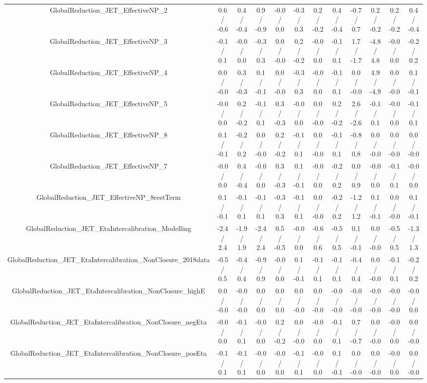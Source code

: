 \begin{table}[htbp]
\begin{center}
\begin{tabular}{|c|c|c|c|c|c|c|c|c|c|c|c|}
  GlobalReduction_JET_EffectiveNP_2 & 0.6 / -0.6 & 0.4 / -0.4 & 0.9 / -0.9 & -0.0 / 0.0 & -0.3 / 0.3 & 0.2 / -0.2 & 0.4 / -0.4 & -0.7 / 0.7 & 0.2 / -0.2 & 0.2 / -0.2 & 0.4 / -0.4 \\ 
  GlobalReduction_JET_EffectiveNP_3 & -0.1 / 0.1 & -0.0 / 0.0 & -0.3 / 0.3 & 0.0 / -0.0 & 0.2 / -0.2 & -0.0 / 0.0 & -0.1 / 0.1 & 1.7 / -1.7 & -4.8 / 4.8 & -0.0 / 0.0 & -0.2 / 0.2 \\ 
  GlobalReduction_JET_EffectiveNP_4 & 0.0 / -0.0 & 0.3 / -0.3 & 0.1 / -0.1 & 0.0 / -0.0 & -0.3 / 0.3 & -0.0 / 0.0 & -0.1 / 0.1 & 0.0 / -0.0 & 4.9 / -4.9 & 0.0 / -0.0 & 0.1 / -0.1 \\ 
  GlobalReduction_JET_EffectiveNP_5 & -0.0 / 0.0 & 0.2 / -0.2 & -0.1 / 0.1 & 0.3 / -0.3 & -0.0 / 0.0 & 0.0 / -0.0 & 0.2 / -0.2 & 2.6 / -2.6 & -0.1 / 0.1 & -0.0 / 0.0 & -0.1 / 0.1 \\ 
  GlobalReduction_JET_EffectiveNP_8 & 0.1 / -0.1 & -0.2 / 0.2 & 0.0 / -0.0 & 0.2 / -0.2 & -0.1 / 0.1 & 0.0 / -0.0 & -0.1 / 0.1 & -0.8 / 0.8 & 0.0 / -0.0 & 0.0 / -0.0 & 0.0 / -0.0 \\ 
  GlobalReduction_JET_EffectiveNP_7 & -0.0 / 0.0 & 0.4 / -0.4 & -0.0 / 0.0 & 0.3 / -0.3 & 0.1 / -0.1 & -0.0 / 0.0 & -0.2 / 0.2 & 0.0 / 0.9 & -0.0 / 0.0 & -0.1 / 0.1 & -0.0 / 0.0 \\ 
  GlobalReduction_JET_EffectiveNP_8restTerm & 0.1 / -0.1 & -0.1 / 0.1 & -0.1 / 0.1 & -0.3 / 0.3 & -0.1 / 0.1 & 0.0 / -0.0 & -0.2 / 0.2 & -1.2 / 1.2 & 0.1 / -0.1 & 0.0 / -0.0 & 0.1 / -0.1 \\ 
  GlobalReduction_JET_EtaIntercalibration_Modelling & -2.4 / 2.4 & -1.9 / 1.9 & -2.4 / 2.4 & 0.5 / -0.5 & -0.0 / 0.0 & -0.6 / 0.6 & -0.5 / 0.5 & 0.1 / -0.1 & 0.0 / -0.0 & -0.5 / 0.5 & -1.3 / 1.3 \\ 
  GlobalReduction_JET_EtaIntercalibration_NonClosure_2018data & -0.5 / 0.5 & -0.4 / 0.4 & -0.9 / 0.9 & -0.0 / 0.0 & 0.1 / -0.1 & -0.1 / 0.1 & -0.1 / 0.1 & -0.4 / 0.4 & 0.0 / -0.0 & -0.1 / 0.1 & -0.2 / 0.2 \\ 
  GlobalReduction_JET_EtaIntercalibration_NonClosure_highE & 0.0 / -0.0 & -0.0 / -0.0 & 0.0 / 0.0 & 0.0 / 0.0 & 0.0 / -0.0 & 0.0 / -0.0 & -0.0 / -0.0 & -0.0 / -0.0 & -0.0 / -0.0 & -0.0 / -0.0 & -0.0 / 0.0 \\ 
  GlobalReduction_JET_EtaIntercalibration_NonClosure_negEta & -0.0 / 0.0 & -0.1 / 0.1 & -0.0 / 0.0 & 0.2 / -0.2 & 0.0 / -0.0 & -0.0 / 0.0 & -0.1 / 0.1 & 0.7 / -0.7 & 0.0 / -0.0 & -0.0 / 0.0 & 0.0 / -0.0 \\ 
  GlobalReduction_JET_EtaIntercalibration_NonClosure_posEta & -0.1 / 0.1 & -0.1 / 0.1 & -0.0 / 0.0 & -0.0 / 0.0 & -0.1 / 0.1 & -0.0 / 0.0 & 0.1 / -0.1 & 0.0 / -0.0 & 0.0 / -0.0 & -0.0 / 0.0 & 0.0 / -0.0 \\ 

\end{tabular}
\end{center}
\end{table}
